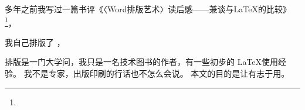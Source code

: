 多年之前我写过一篇书评《〈Word排版艺术〉读后感——兼谈与LaTeX的比较》
\footnote{}，

我自己排版了 \mybooktitle，

排版是一门大学问，我只是一名技术图书的作者，有一些初步的 \LaTeX 使用经验。
我不是专家，出版印刷的行话也不怎么会说。
本文的目的是让有志于用。